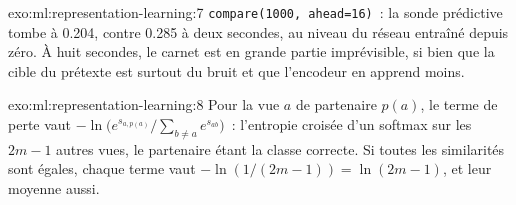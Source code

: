 \begin{solution}{exo:ml:representation-learning:7}
\texttt{compare(1000, ahead=16)}~: la sonde prédictive tombe à 0.204, contre 0.285 à deux secondes, au niveau du réseau
entraîné depuis zéro. À huit secondes, le carnet est en grande partie imprévisible, si bien que la cible du prétexte est surtout du bruit et que
l'encodeur en apprend moins.
\end{solution}

\begin{solution}{exo:ml:representation-learning:8}
Pour la vue $a$ de partenaire $p(a)$, le terme de perte vaut $-\ln\bigl(e^{s_{a,p(a)}}/\sum_{b\ne a}e^{s_{ab}}\bigr)$~:
l'entropie croisée d'un softmax sur les $2m - 1$ autres vues, le partenaire étant la classe correcte. Si toutes les similarités sont
égales, chaque terme vaut $-\ln(1/(2m-1)) = \ln(2m - 1)$, et leur moyenne aussi.
\end{solution}

